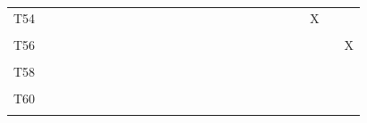 \documentclass[
]{article}
\begin{document}
\begin{longtable}[l]{lllllllllllllllllllllllll}
T54 &  &  &  &  &  &  &  &  &  &  &  &  &  &  &  &  &  &  &  &  &  & X &  & \\
\cellcolor{gray!6}{T55} & \cellcolor{gray!6}{} & \cellcolor{gray!6}{} & \cellcolor{gray!6}{} & \cellcolor{gray!6}{} & \cellcolor{gray!6}{} & \cellcolor{gray!6}{} & \cellcolor{gray!6}{} & \cellcolor{gray!6}{} & \cellcolor{gray!6}{} & \cellcolor{gray!6}{} & \cellcolor{gray!6}{} & \cellcolor{gray!6}{} & \cellcolor{gray!6}{} & \cellcolor{gray!6}{} & \cellcolor{gray!6}{} & \cellcolor{gray!6}{} & \cellcolor{gray!6}{} & \cellcolor{gray!6}{} & \cellcolor{gray!6}{} & \cellcolor{gray!6}{} & \cellcolor{gray!6}{} & \cellcolor{gray!6}{} & \cellcolor{gray!6}{X} & \cellcolor{gray!6}{}\\
\addlinespace
T56 &  &  &  &  &  &  &  &  &  &  &  &  &  &  &  &  &  &  &  &  &  &  &  & X\\
\cellcolor{gray!6}{T57} & \cellcolor{gray!6}{} & \cellcolor{gray!6}{} & \cellcolor{gray!6}{} & \cellcolor{gray!6}{} & \cellcolor{gray!6}{} & \cellcolor{gray!6}{} & \cellcolor{gray!6}{} & \cellcolor{gray!6}{} & \cellcolor{gray!6}{} & \cellcolor{gray!6}{} & \cellcolor{gray!6}{} & \cellcolor{gray!6}{} & \cellcolor{gray!6}{} & \cellcolor{gray!6}{} & \cellcolor{gray!6}{} & \cellcolor{gray!6}{} & \cellcolor{gray!6}{} & \cellcolor{gray!6}{} & \cellcolor{gray!6}{} & \cellcolor{gray!6}{} & \cellcolor{gray!6}{} & \cellcolor{gray!6}{} & \cellcolor{gray!6}{} & \cellcolor{gray!6}{}\\
T58 &  &  &  &  &  &  &  &  &  &  &  &  &  &  &  &  &  &  &  &  &  &  &  & \\
\cellcolor{gray!6}{T59} & \cellcolor{gray!6}{} & \cellcolor{gray!6}{} & \cellcolor{gray!6}{} & \cellcolor{gray!6}{} & \cellcolor{gray!6}{} & \cellcolor{gray!6}{} & \cellcolor{gray!6}{} & \cellcolor{gray!6}{} & \cellcolor{gray!6}{} & \cellcolor{gray!6}{} & \cellcolor{gray!6}{} & \cellcolor{gray!6}{} & \cellcolor{gray!6}{} & \cellcolor{gray!6}{} & \cellcolor{gray!6}{} & \cellcolor{gray!6}{} & \cellcolor{gray!6}{} & \cellcolor{gray!6}{} & \cellcolor{gray!6}{} & \cellcolor{gray!6}{} & \cellcolor{gray!6}{} & \cellcolor{gray!6}{} & \cellcolor{gray!6}{} & \cellcolor{gray!6}{}\\
T60 &  &  &  &  &  &  &  &  &  &  &  &  &  &  &  &  &  &  &  &  &  &  &  & \\
\addlinespace
\cellcolor{gray!6}{T61} & \cellcolor{gray!6}{} & \cellcolor{gray!6}{} & \cellcolor{gray!6}{} & \cellcolor{gray!6}{} & \cellcolor{gray!6}{} & \cellcolor{gray!6}{} & \cellcolor{gray!6}{} & \cellcolor{gray!6}{} & \cellcolor{gray!6}{} & \cellcolor{gray!6}{} & \cellcolor{gray!6}{} & \cellcolor{gray!6}{} & \cellcolor{gray!6}{} & \cellcolor{gray!6}{} & \cellcolor{gray!6}{} & \cellcolor{gray!6}{} & \cellcolor{gray!6}{} & \cellcolor{gray!6}{} & \cellcolor{gray!6}{} & \cellcolor{gray!6}{} & \cellcolor{gray!6}{} & \cellcolor{gray!6}{} & \cellcolor{gray!6}{} & \cellcolor{gray!6}{}\\*
\end{longtable}
\end{document}

